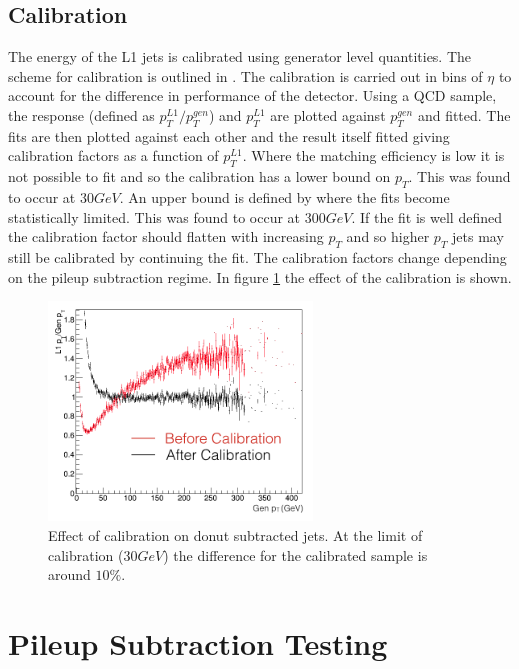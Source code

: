 \subsection{Calibration}
The energy of the L1 jets is calibrated using generator level quantities. The scheme for calibration is outlined in \cite{l1jet_calibration}. The calibration is carried out in bins of $\eta$ to account for the difference in performance of the detector. Using a QCD sample, the response (defined as $p^{L1}_{T}/p^{gen}_{T}$) and $p^{L1}_{T}$ are plotted against $p^{gen}_{T}$ and fitted. The fits are then plotted against each other and the result itself fitted giving calibration factors as a function of $p^{L1}_{T}$.  Where the matching efficiency is low it is not possible to fit and so the calibration has a lower bound on $p_T$. This was found to occur at $30GeV$. An upper bound is defined by where the fits become statistically limited. This was found to occur at $300GeV$. If the fit is well defined the calibration factor should flatten with increasing $p_T$ and so higher $p_T$ jets may still be calibrated by continuing the fit. The calibration factors change depending on the pileup subtraction regime. In figure \ref{calib} the effect of the calibration is shown.   

\begin{figure}
\centering
    \includegraphics[width=7cm]{./Figures/calibration}
  \caption{Effect of calibration on donut subtracted jets. At the limit of calibration ($30GeV$) the difference for the calibrated sample is around $10\%$.}
  \label{calib}
\end{figure}
\section{Pileup Subtraction Testing}

